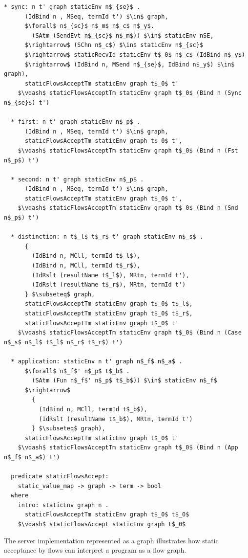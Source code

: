 \documentclass[letterpaper, 11pt]{report}
\begin{document}
\begin{lstlisting}[language=logic, mathescape]
  * sync: n t' graph staticEnv n$_{se}$ .
      (IdBind n , MSeq, termId t') $\in$ graph,
      $\forall$ n$_{sc}$ n$_m$ n$_c$ n$_y$.
        (SAtm (SendEvt n$_{sc}$ n$_m$)) $\in$ staticEnv nSE,
      $\rightarrow$ (SChn n$_c$) $\in$ staticEnv n$_{sc}$
      $\rightarrow$ staticRecvId staticEnv t$_0$ n$_c$ (IdBind n$_y$)
      $\rightarrow$ (IdBind n, MSend n$_{se}$, IdBind n$_y$) $\in$ graph),
      staticFlowsAcceptTm staticEnv graph t$_0$ t'
    $\vdash$ staticFlowsAcceptTm staticEnv graph t$_0$ (Bind n (Sync n$_{se}$) t')

  * first: n t' graph staticEnv n$_p$ .
      (IdBind n , MSeq, termId t') $\in$ graph,
      staticFlowsAcceptTm staticEnv graph t$_0$ t',
    $\vdash$ staticFlowsAcceptTm staticEnv graph t$_0$ (Bind n (Fst n$_p$) t')

  * second: n t' graph staticEnv n$_p$ .
      (IdBind n , MSeq, termId t') $\in$ graph,
      staticFlowsAcceptTm staticEnv graph t$_0$ t',
    $\vdash$ staticFlowsAcceptTm staticEnv graph t$_0$ (Bind n (Snd n$_p$) t')

  * distinction: n t$_l$ t$_r$ t' graph staticEnv n$_s$ .
      {
        (IdBind n, MCll, termId t$_l$),
        (IdBind n, MCll, termId t$_r$),
        (IdRslt (resultName t$_l$), MRtn, termId t'),
        (IdRslt (resultName t$_r$), MRtn, termId t')
      } $\subseteq$ graph,
      staticFlowsAcceptTm staticEnv graph t$_0$ t$_l$,
      staticFlowsAcceptTm staticEnv graph t$_0$ t$_r$,
      staticFlowsAcceptTm staticEnv graph t$_0$ t'
    $\vdash$ staticFlowsAcceptTm staticEnv graph t$_0$ (Bind n (Case n$_s$ n$_l$ t$_l$ n$_r$ t$_r$) t')

  * application: staticEnv n t' graph n$_f$ n$_a$ .
      $\forall$ n$_f$' n$_p$ t$_b$ . 
        (SAtm (Fun n$_f$' n$_p$ t$_b$)) $\in$ staticEnv n$_f$
      $\rightarrow$
        {
          (IdBind n, MCll, termId t$_b$),
          (IdRslt (resultName t$_b$), MRtn, termId t')
        } $\subseteq$ graph),
      staticFlowsAcceptTm staticEnv graph t$_0$ t'
    $\vdash$ staticFlowsAcceptTm staticEnv graph t$_0$ (Bind n (App n$_f$ n$_a$) t')

  predicate staticFlowsAccept:
    static_value_map -> graph -> term -> bool
  where
    intro: staticEnv graph n .
      staticFlowsAcceptTm staticEnv graph t$_0$ t$_0$
    $\vdash$ staticFlowsAccept staticEnv graph t$_0$ 

\end{lstlisting}

The server implementation represented as a graph illustrates how static acceptance by
flows can interpret a program as a flow graph.
\end{document}
